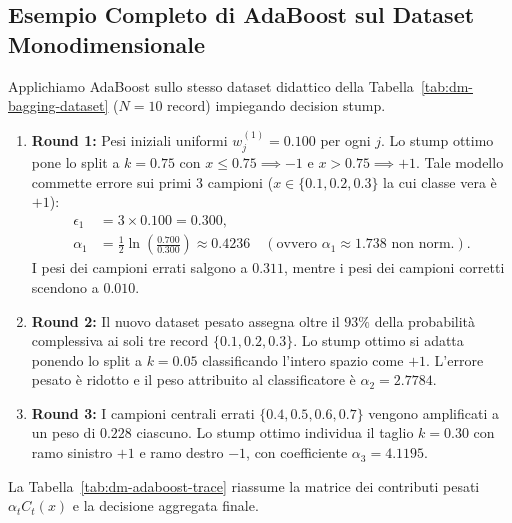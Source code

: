 \FloatBarrier
\subsection{Esempio Completo di AdaBoost sul Dataset Monodimensionale}
\label{subsec:dm-adaboost-example}

Applichiamo AdaBoost sullo stesso dataset didattico della Tabella~\ref{tab:dm-bagging-dataset} ($N = 10$ record) impiegando decision stump.

\begin{enumerate}
    \item \textbf{Round 1:} Pesi iniziali uniformi $w_j^{(1)} = 0.100$ per ogni $j$.
    Lo stump ottimo pone lo split a $k = 0.75$ con $x \le 0.75 \implies -1$ e $x > 0.75 \implies +1$. Tale modello commette errore sui primi 3 campioni ($x \in \{0.1, 0.2, 0.3\}$ la cui classe vera è $+1$):
    \begin{align*}
        \epsilon_1 &= 3 \times 0.100 = 0.300, \\
        \alpha_1 &= \frac{1}{2} \ln\left(\frac{0.700}{0.300}\right) \approx 0.4236 \quad (\text{ovvero } \alpha_1 \approx 1.738 \text{ non norm.}).
    \end{align*}
    I pesi dei campioni errati salgono a $0.311$, mentre i pesi dei campioni corretti scendono a $0.010$.

    \item \textbf{Round 2:} Il nuovo dataset pesato assegna oltre il $93\%$ della probabilità complessiva ai soli tre record $\{0.1, 0.2, 0.3\}$. Lo stump ottimo si adatta ponendo lo split a $k = 0.05$ classificando l'intero spazio come $+1$. L'errore pesato è ridotto e il peso attribuito al classificatore è $\alpha_2 = 2.7784$.

    \item \textbf{Round 3:} I campioni centrali errati $\{0.4, 0.5, 0.6, 0.7\}$ vengono amplificati a un peso di $0.228$ ciascuno. Lo stump ottimo individua il taglio $k = 0.30$ con ramo sinistro $+1$ e ramo destro $-1$, con coefficiente $\alpha_3 = 4.1195$.
\end{enumerate}

La Tabella~\ref{tab:dm-adaboost-trace} riassume la matrice dei contributi pesati $\alpha_t C_t(x)$ e la decisione aggregata finale.

